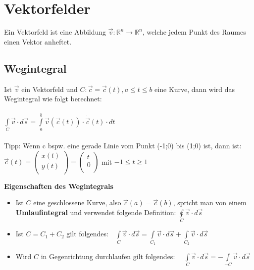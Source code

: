\section{Vektorfelder}
Ein Vektorfeld ist eine Abbildung $\vec{v}:\mathbb{R}^n\rightarrow
\mathbb{R}^n$, welche jedem Punkt des Raumes einen Vektor anheftet.
\subsection{Wegintegral}
Ist $\vec{v}$ ein Vektorfeld und $C:\vec{c}=\vec{c}(t),a\leq t \leq b$ eine
Kurve, dann wird das Wegintegral wie folgt berechnet:\\\\
$\boxed{\int\limits_C\vec{v}\cdot d\vec{s}=
\int\limits_a^b\vec{v}(\vec{c}(t))\cdot \dot{\vec{c}}(t)\cdot dt}$\\\\
Tipp: Wenn c bspw. eine gerade Linie vom Punkt (-1;0) bis (1;0) ist, dann ist:\\
$\vec{c}(t)=
  \begin{pmatrix}
      x(t)\\
      y(t)\\
  \end{pmatrix}
  =
    \begin{pmatrix}
      t\\
      0\\
  \end{pmatrix}$
  mit $-1\leq{t}\geq{1}$

\textbf{Eigenschaften des Wegintegrals}
\begin{itemize}
  \item Ist $C$ eine geschlossene Kurve, also $\vec{c}(a)=\vec{c}(b)$, spricht
  man von einem \textbf{Umlaufintegral} und verwendet folgende Definition:
  $\oint\limits_C \vec{v}\cdot d\vec{s}$
  \item Ist $C=C_1+C_2$ gilt folgendes:$\quad\int\limits_C \vec{v}\cdot
  d\vec{s}=\int\limits_{C_1} \vec{v}\cdot d\vec{s}+\int\limits_{C_2}
  \vec{v}\cdot d\vec{s}$
  \item Wird $C$ in Gegenrichtung durchlaufen gilt folgendes:
  $\quad\int\limits_C \vec{v}\cdot
  d\vec{s}=-\int\limits_{-C} \vec{v}\cdot d\vec{s}$
\end{itemize}

